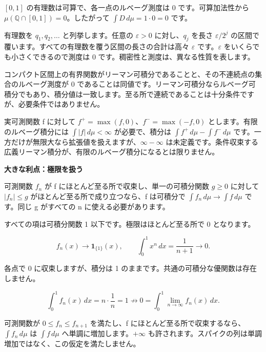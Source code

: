 \documentclass[11pt,a4paper]{article}
\newcommand{\topic}[1]{\vspace{6pt}{\large\bfseries #1}\par}
\newcommand{\pagetitle}[1]{{\LARGE\bfseries #1}\par\vspace{9pt}}
\begin{document}
\([0,1]\) の有理数は可算で、各一点のルベーグ測度は 0 です。可算加法性から \(\mu(\mathbb Q\cap[0,1])=0\)。したがって \(\int D\,d\mu=1\cdot0=0\) です。

\topic{測度 0 は「空」を意味しません}

有理数を \(q_1,q_2,\ldots\) と列挙します。任意の \(\varepsilon>0\) に対し、\(q_j\) を長さ \(\varepsilon/2^j\) の区間で覆います。すべての有理数を覆う区間の長さの合計は高々 \(\varepsilon\) です。\(\varepsilon\) をいくらでも小さくできるので測度は 0 です。稠密性と測度は、異なる性質を表します。

\topic{二つの積分が一致する条件}

コンパクト区間上の有界関数がリーマン可積分であることと、その不連続点の集合のルベーグ測度が 0 であることは同値です。リーマン可積分ならルベーグ可積分でもあり、積分値は一致します。至る所で連続であることは十分条件ですが、必要条件ではありません。

\topic{符号付き関数と広義積分}

実可測関数 f に対して \(f^+=\max(f,0)\)、\(f^-=\max(-f,0)\) とします。有限のルベーグ積分には \(\int|f|\,d\mu<\infty\) が必要で、積分は \(\int f^+\,d\mu-\int f^-\,d\mu\) です。一方だけが無限大なら拡張値を扱えますが、\(\infty-\infty\) は未定義です。条件収束する広義リーマン積分が、有限のルベーグ積分になるとは限りません。

\newpage

\pagetitle{大きな利点：極限を扱う}

\topic{優収束定理}

可測関数 \(f_n\) が f にほとんど至る所で収束し、単一の可積分関数 \(g\ge0\) に対して \(|f_n|\le g\) がほとんど至る所で成り立つなら、f は可積分で \(\int f_n\,d\mu\to\int f\,d\mu\) です。同じ g がすべての n に使える必要があります。

\topic{$f_n(x)=x^n$}

すべての項は可積分関数 1 以下です。極限はほとんど至る所で 0 となります。

\[f_n(x)\longrightarrow\mathbf1_{\{1\}}(x),\qquad\int_0^1x^n\,dx=\frac1{n+1}\longrightarrow0.\]

\topic{$f_n(x)=n\,\mathbf1_{(0,1/n)}(x)$}

各点で 0 に収束しますが、積分は 1 のままです。共通の可積分な優関数は存在しません。

\[\int_0^1 f_n(x)\,dx=n\cdot\frac1n=1\not\longrightarrow0=\int_0^1\lim_{n\to\infty}f_n(x)\,dx.\]

\topic{単調収束定理}

可測関数が \(0\le f_n\le f_{n+1}\) を満たし、f にほとんど至る所で収束するなら、\(\int f_n\,d\mu\) は \(\int f\,d\mu\) へ単調に増加します。\(+\infty\) も許されます。スパイクの列は単調増加ではなく、この仮定を満たしません。
\end{document}

